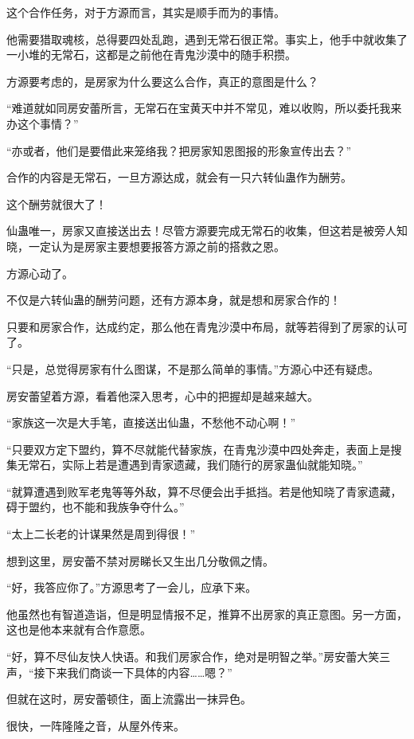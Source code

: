 \begin{this_body}
这个合作任务，对于方源而言，其实是顺手而为的事情。

他需要猎取魂核，总得要四处乱跑，遇到无常石很正常。事实上，他手中就收集了一小堆的无常石，这都是之前他在青鬼沙漠中的随手积攒。

方源要考虑的，是房家为什么要这么合作，真正的意图是什么？

“难道就如同房安蕾所言，无常石在宝黄天中并不常见，难以收购，所以委托我来办这个事情？”

“亦或者，他们是要借此来笼络我？把房家知恩图报的形象宣传出去？”

合作的内容是无常石，一旦方源达成，就会有一只六转仙蛊作为酬劳。

这个酬劳就很大了！

仙蛊唯一，房家又直接送出去！尽管方源要完成无常石的收集，但这若是被旁人知晓，一定认为是房家主要想要报答方源之前的搭救之恩。

方源心动了。

不仅是六转仙蛊的酬劳问题，还有方源本身，就是想和房家合作的！

只要和房家合作，达成约定，那么他在青鬼沙漠中布局，就等若得到了房家的认可了。

“只是，总觉得房家有什么图谋，不是那么简单的事情。”方源心中还有疑虑。

房安蕾望着方源，看着他深入思考，心中的把握却是越来越大。

“家族这一次是大手笔，直接送出仙蛊，不愁他不动心啊！”

“只要双方定下盟约，算不尽就能代替家族，在青鬼沙漠中四处奔走，表面上是搜集无常石，实际上若是遭遇到青家遗藏，我们随行的房家蛊仙就能知晓。”

“就算遭遇到败军老鬼等等外敌，算不尽便会出手抵挡。若是他知晓了青家遗藏，碍于盟约，也不能和我族争夺什么。”

“太上二长老的计谋果然是周到得很！”

想到这里，房安蕾不禁对房睇长又生出几分敬佩之情。

“好，我答应你了。”方源思考了一会儿，应承下来。

他虽然也有智道造诣，但是明显情报不足，推算不出房家的真正意图。另一方面，这也是他本来就有合作意愿。

“好，算不尽仙友快人快语。和我们房家合作，绝对是明智之举。”房安蕾大笑三声，“接下来我们商谈一下具体的内容……嗯？”

但就在这时，房安蕾顿住，面上流露出一抹异色。

很快，一阵隆隆之音，从屋外传来。


\end{this_body}
